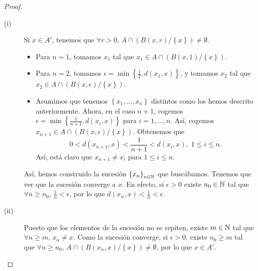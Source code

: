 \begin{proof}
\begin{description}
	\item[(i)] Si $\displaystyle x \in A' $, tenemos que $\displaystyle \forall r> 0 $, $\displaystyle A \cap \left(B\left(x,r\right)/ \left\{ x\right\} \right) \neq \emptyset $. 
		\begin{itemize}
			\item Para $\displaystyle n = 1 $, tomamos $\displaystyle x_{1} $ tal que $\displaystyle x_{1} \in A \cap \left(B\left(x,1\right) / \left\{ x\right\} \right) $.
			\item Para $\displaystyle n = 2 $, tomamos $\displaystyle \epsilon = \min \left\{ \frac{1}{2}, d\left(x_{1}, x\right)\right\}  $, y tomamos $\displaystyle x_{2} $ tal que $\displaystyle x_{2} \in A \cap \left(B\left(x,\epsilon \right) / \left\{ x\right\} \right) $.
			\item Asumimos que tenemos $\displaystyle \left\{ x_{1}, \ldots, x_{n}\right\}  $ distintos como los hemos descrito anteriormente. Ahora, en el caso $\displaystyle n +1 $, cogemos $\displaystyle \epsilon = \min \left\{ \frac{1}{n+1}, d\left(x_{i}, x\right)\right\}  $ para $\displaystyle i = 1, \ldots, n $. Así, cogemos $\displaystyle x_{n+1} \in A \cap \left(B\left(x,\epsilon \right)/ \left\{ x\right\} \right)  $. Obtenemos que
				\[0 < d\left(x_{n+1}, x\right) < \frac{1}{n+1} < d\left(x_{i}, x\right), \; 1 \leq i \leq n .\]
				Así, está claro que $\displaystyle x_{n+1} \neq x_{i} $ para $\displaystyle 1 \leq i \leq n $.
		\end{itemize}
		Así, hemos construido la sucesión $\displaystyle \left\{ x_{n}\right\} _{n\in\mathbb{N}} $ que buscábamos. Tenemos que ver que la sucesión converge a $\displaystyle x $. En efecto, si $\displaystyle \epsilon > 0 $ existe $\displaystyle n_{0} \in \mathbb{N} $ tal que $\displaystyle \forall n \geq n_{0} $, $\displaystyle \frac{1}{n} < \epsilon  $, por lo que $\displaystyle d\left(x_{n}, x\right)<\frac{1}{n} < \epsilon  $.
	\item[(ii)] Puesto que los elementos de la sucesión no se repiten, existe $\displaystyle m \in \mathbb{N} $ tal que $\displaystyle \forall n \geq m $, $\displaystyle x_{n} \neq x $. Como la sucesión converge, si $\displaystyle \epsilon > 0 $, existe $\displaystyle n_{0} \geq m$ tal que $\displaystyle \forall n \geq n_{0} $, $\displaystyle A \cap \left(B\left(x_{n}, x\right) / \left\{ x\right\} \right) \neq \emptyset $, por lo que $\displaystyle x \in A' $.
\end{description}
\end{proof}
